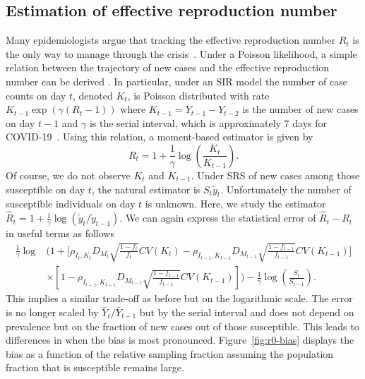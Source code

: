 \documentclass[11pt]{amsart}
\numberwithin{equation}{section}
\theoremstyle{plain}
\begin{document}
\subsection{Estimation of effective reproduction number}
\label{section:r0-estimation}
Many epidemiologists argue that tracking the effective reproduction number $R_t$ is the only way to manage through the crisis~\citep{Gabriel2020}.  Under a Poisson likelihood, a simple relation between the trajectory of new cases and the effective reproduction number can be derived \citep{Bettencourt2008}.  In particular, under an SIR model the number of case counts on day $t$, denoted $K_t$, is Poisson distributed with rate $K_{t-1} \exp \left( \gamma (R_t - 1) \right)$ where $K_{t-1} = Y_{t-1}-Y_{t-2}$ is the number of new cases on day $t-1$ and $\gamma$ is the serial interval, which is approximately $7$ days for COVID-19~\citep{Sanche2020}.  Using this relation, a moment-based estimator is given by
$$
R_t = 1 + \frac{1}{\gamma} \log \left( \frac{K_t}{K_{t-1}} \right).
$$
Of course, we do not observe $K_t$ and $K_{t-1}$.  Under SRS of new cases among those susceptible on day $t$, the natural estimator is $S_t \tilde y_t$.  Unfortunately the number of susceptible individuals on day $t$ is unknown.  Here, we study the estimator $\hat R_t = 1 + \frac{1}{\gamma} \log \left( \tilde y_t / \tilde y_{t-1} \right)$. We can again express the statistical error of $\hat R_t - R_t$ in useful terms as follows
$$
\begin{aligned}
\frac{1}{\gamma}\log &\bigg( 1 + \bigg[ \rho_{I_t,K_t} D_{M_t} \sqrt{\frac{1-f_t}{f_t}} CV (K_t)  -\rho_{I_{t-1},K_{t-1}} D_{M_{t-1}} \sqrt{\frac{1-f_{t-1}}{f_{t-1}}} CV (K_{t-1}) \bigg] \\
&\times \left[ 1 - \rho_{I_{t-1},K_{t-1}} D_{M_{t-1}} \sqrt{\frac{1-f_{t-1}}{f_{t-1}}} CV (K_{t-1}) \right] \bigg) - \frac{1}{\gamma} \log \left( \frac{S_t}{S_{t-1}} \right).
\end{aligned}
$$
This implies a similar trade-off as before but on the logarithmic scale.  The error is no longer scaled by $\bar Y_t/\bar Y_{t-1}$ but by the serial interval and does not depend on prevalence but on the fraction of new cases out of those susceptible. This leads to differences in when the bias is most pronounced. Figure~\ref{fig:r0-bias} displays the bias as a function of the relative sampling fraction assuming the population fraction that is susceptible remains large.
\end{document}
